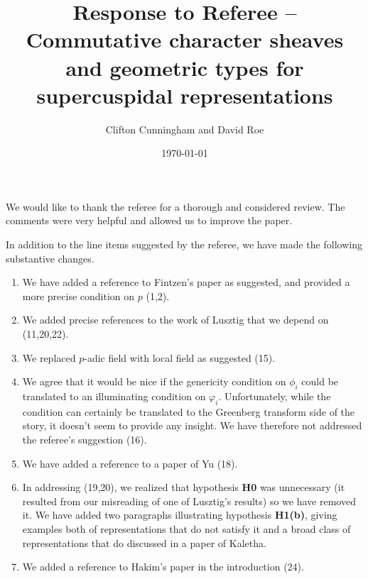 \documentclass[11pt]{article}
\title{Response to Referee -- \\ Commutative character sheaves and geometric types for supercuspidal representations}
\author{Clifton Cunningham and David Roe}
\date{\today}
\begin{document}
\maketitle

We would like to thank the referee for a thorough and considered review.  The comments were very helpful and allowed us to improve the paper.

In addition to the line items suggested by the referee, we have made the following substantive changes.

\begin{enumerate}
\item We have added a reference to Fintzen's paper as suggested, and provided a more precise condition on $p$ (1,2).
\item We added precise references to the work of Lusztig that we depend on (11,20,22).
\item We replaced $p$-adic field with local field as suggested (15).
\item We agree that it would be nice if the genericity condition on $\phi_i$ could be translated to an illuminating condition on $\varphi_i$.  Unfortunately, while the condition can certainly be translated to the Greenberg transform side of the story, it doesn't seem to provide any insight.  We have therefore not addressed the referee's suggestion (16).
\item We have added a reference to a paper of Yu (18).
\item In addressing (19,20), we realized that hypothesis \textbf{H0} was unnecessary (it resulted from our misreading of one of Lusztig's results) so we have removed it.  We have added two paragraphs illustrating hypothesis \textbf{H1(b)}, giving examples both of representations that do not satisfy it and a broad class of representations that do discussed in a paper of Kaletha.
\item We added a reference to Hakim's paper in the introduction (24).
\end{enumerate}
\end{document}
